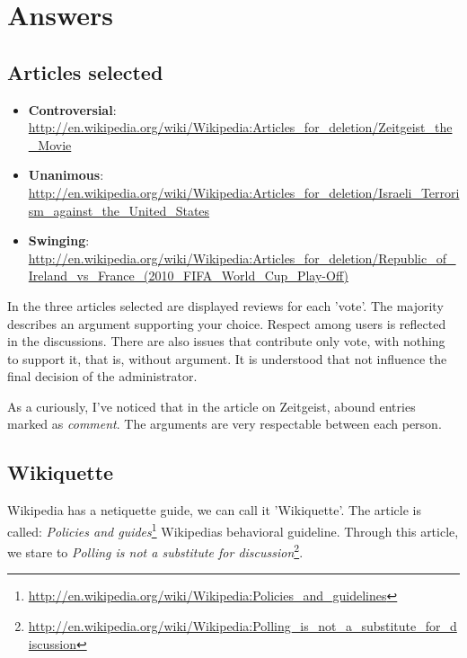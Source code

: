 \documentclass[11pt]{scrartcl}
\begin{document}
\section{Answers}
\label{sec:answers}

\subsection{Articles selected}
\label{sub:list-of-articles}

\begin{itemize}
	\item \textbf{Controversial}: \url{http://en.wikipedia.org/wiki/Wikipedia:Articles_for_deletion/Zeitgeist_the_Movie}
	\item \textbf{Unanimous}: \url{http://en.wikipedia.org/wiki/Wikipedia:Articles_for_deletion/Israeli_Terrorism_against_the_United_States}
	\item \textbf{Swinging}: \url{http://en.wikipedia.org/wiki/Wikipedia:Articles_for_deletion/Republic_of_Ireland_vs_France_(2010_FIFA_World_Cup_Play-Off)}
\end{itemize}

\par In the three articles selected are displayed reviews for each 'vote'. The majority describes an argument supporting your choice. Respect among users is reflected in the discussions.
There are also issues that contribute only vote, with nothing to support it, that is, without argument. It is understood that not influence the final decision of the administrator.

\par As a curiously, I've noticed that in the article on Zeitgeist, abound entries marked as \emph{comment}. The arguments are very respectable between each person.

\subsection{Wikiquette}
\label{sub:wikiquette}

\par Wikipedia has a netiquette guide, we can call it 'Wikiquette'. The article is called: \emph{Policies and guides}\footnote{\url{http://en.wikipedia.org/wiki/Wikipedia:Policies_and_guidelines}} Wikipedias behavioral guideline. Through this article, we stare to \emph{Polling is not a substitute for discussion}\footnote{\url{http://en.wikipedia.org/wiki/Wikipedia:Polling_is_not_a_substitute_for_discussion}}. 
\end{document}
